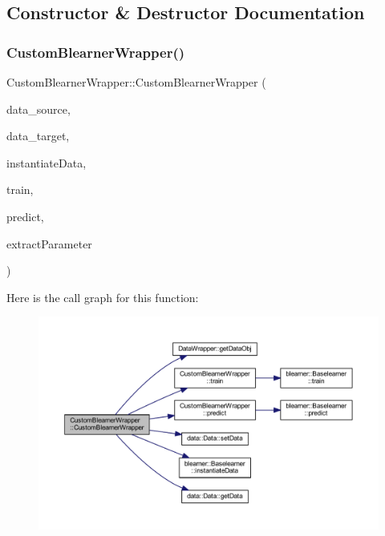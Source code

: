 \subsection{Constructor \& Destructor Documentation}
\mbox{\label{class_custom_blearner_wrapper_a2fd4bb5e6f0c8fb5cae69ef46a5e2db8}} 
\subsubsection{\texorpdfstring{Custom\+Blearner\+Wrapper()}{CustomBlearnerWrapper()}}
{\footnotesize\ttfamily Custom\+Blearner\+Wrapper\+::\+Custom\+Blearner\+Wrapper (\begin{DoxyParamCaption}\item[{\mbox{\hyperlink{class_data_wrapper}{Data\+Wrapper}} \&}]{data\+\_\+source,  }\item[{\mbox{\hyperlink{class_data_wrapper}{Data\+Wrapper}} \&}]{data\+\_\+target,  }\item[{Rcpp\+::\+Function}]{instantiate\+Data,  }\item[{Rcpp\+::\+Function}]{train,  }\item[{Rcpp\+::\+Function}]{predict,  }\item[{Rcpp\+::\+Function}]{extract\+Parameter }\end{DoxyParamCaption})\hspace{0.3cm}{\ttfamily [inline]}}

Here is the call graph for this function\+:\nopagebreak
\begin{figure}[H]
\begin{center}
\leavevmode
\includegraphics[width=350pt]{class_custom_blearner_wrapper_a2fd4bb5e6f0c8fb5cae69ef46a5e2db8_cgraph}
\end{center}
\end{figure}


